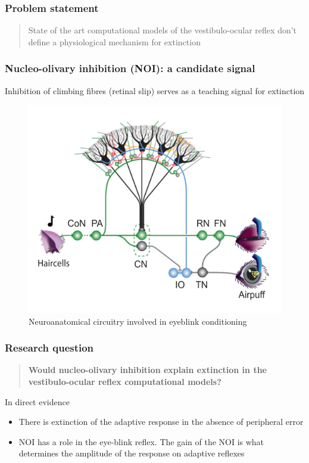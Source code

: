 \documentclass[10pt, compress]{beamer}
\begin{document}
\begin{frame}[fragile]
  \frametitle{Problem statement}
  \begin{quote}
    State of the art computational models of the vestibulo-ocular reflex don't define a physiological mechanism for extinction
  \end{quote}
\end{frame}

\begin{frame}[fragile]
  \frametitle{Nucleo-olivary inhibition (NOI): a candidate signal}
  Inhibition of climbing fibres (retinal slip) serves as a teaching signal for extinction \cite{Medina2002}
  \begin{figure}
    \includegraphics[scale=0.3]{images/schonewille-ebc.png}
    \caption{Neuroanatomical circuitry involved in eyeblink conditioning \cite{Schonewille2010}}
  \end{figure}
\end{frame}

\begin{frame}[fragile]
  \frametitle{Research question}
  \begin{quote}
    \textbf{Would nucleo-olivary inhibition explain extinction in the vestibulo-ocular reflex computational models?}
  \end{quote}
  \begin{block}{\alert{In direct evidence}}
    \begin{itemize}
      \item There is extinction of the adaptive response in the absence of peripheral error
      \item NOI has a role in the eye-blink reflex. The gain of the NOI is what determines the amplitude of the response on adaptive reflexes \cite{Emken2007, Herreros2013b}
    \end{itemize}
  \end{block}
\end{frame}
\end{document}
